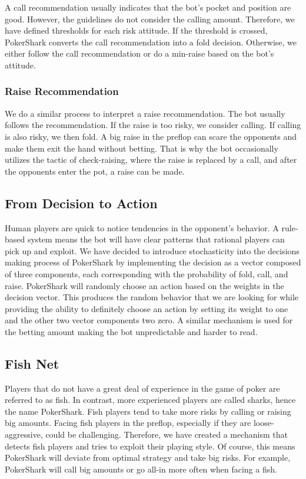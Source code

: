 A call recommendation usually indicates that the bot's pocket and position are good. However, the guidelines do not consider the calling amount. Therefore, we have defined thresholds for each risk attitude. If the threshold is crossed, PokerShark converts the call recommendation into a fold decision. Otherwise, we either follow the call recommendation or do a min-raise based on the bot's attitude.

\subsubsection{Raise Recommendation}
We do a similar process to interpret a raise recommendation. The bot usually follows the recommendation. If the raise is too risky, we consider calling. If calling is also risky, we then fold. A big raise in the preflop can scare the opponents and make them exit the hand without betting. That is why the bot occasionally utilizes the tactic of check-raising, where the raise is replaced by a call, and after the opponents enter the pot, a raise can be made.


\subsection{From Decision to Action}

Human players are quick to notice tendencies in the opponent's behavior. A rule-based system means the bot will have clear patterns that rational players can pick up and exploit. We have decided to introduce stochasticity into the decisions making process of PokerShark by implementing the decision as a vector composed of three components, each corresponding with the probability of fold, call, and raise. PokerShark will randomly choose an action based on the weights in the decision vector. This produces the random behavior that we are looking for while providing the ability to definitely choose an action by setting its weight to one and the other two vector components two zero. A similar mechanism is used for the betting amount making the bot unpredictable and harder to read.




\subsection{Fish Net}
Players that do not have a great deal of experience in the game of poker are referred to as fish. In contrast, more experienced players are called sharks, hence the name PokerShark.
Fish players tend to take more risks by calling or raising big amounts. Facing fish players in the preflop, especially if they are loose-aggressive, could be challenging. Therefore, we have created a mechanism that detects fish players and tries to exploit their playing style. Of course, this means PokerShark will deviate from optimal strategy and take big risks. For example, PokerShark will call big amounts or go all-in more often when facing a fish.


